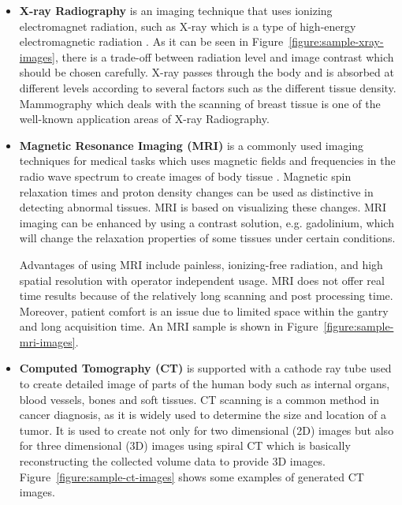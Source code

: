         \begin{itemize}

            \item \textbf{X-ray Radiography} is an imaging technique that uses ionizing electromagnet radiation, such as X-ray which is a type of high-energy electromagnetic radiation \cite{kasban2015comparative}.
                    As it can be seen in Figure~\ref{figure:sample-xray-images}, there is a trade-off between radiation level and image contrast which should be chosen carefully.
                    X-ray passes through the body and is absorbed at different levels according to several factors such as the different tissue density.
                    Mammography which deals with the scanning of breast tissue is one of the well-known application areas of X-ray Radiography.

                    

            \item \textbf{Magnetic Resonance Imaging (MRI)} is a commonly used imaging techniques for medical tasks
                    which uses magnetic fields and frequencies in the radio wave spectrum to create images of body tissue \cite{mehmood2013prioritization}.
                    Magnetic spin relaxation times and proton density changes can be used as distinctive in detecting abnormal tissues.
                    MRI is based on visualizing these changes.
                    MRI imaging can be enhanced by using a contrast solution, e.g. gadolinium, which will change the relaxation properties of some tissues under certain conditions.

                    

                    Advantages of using MRI include painless, ionizing-free radiation, and high spatial resolution with operator independent usage.
                    MRI does not offer real time results because of the relatively long scanning and post processing time.
                    Moreover, patient comfort is an issue due to limited space within the gantry and long acquisition time.
                    An MRI sample is shown in Figure~\ref{figure:sample-mri-images}.

            \item \textbf{Computed Tomography (CT)} is supported with a cathode ray tube used to create detailed image of parts of the human body
                    such as internal organs, blood vessels, bones and soft tissues.
                    CT scanning is a common method in cancer diagnosis, as it is widely used to determine the size and location of a tumor.
                    It is used to create not only for two dimensional (2D) images but also for three dimensional (3D) images
                    using spiral CT which is basically reconstructing the collected volume data to provide 3D images. Figure~\ref{figure:sample-ct-images} shows some examples of generated CT images.


\end{itemize}
